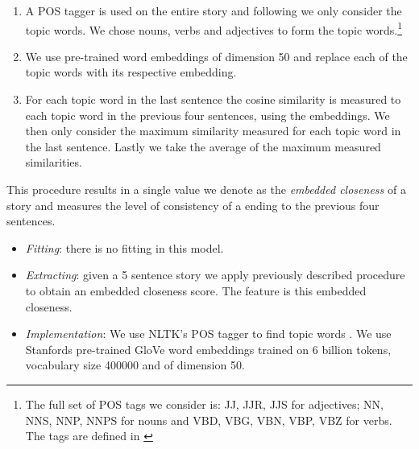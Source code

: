 \documentclass{article}
\begin{document}
\begin{enumerate}
	\item A POS tagger is used on the entire story and following \cite{COGCOMP} we only consider the topic words. We chose nouns, verbs and adjectives to form the topic words.\footnote{The full set of POS tags we consider is: JJ, JJR, JJS for adjectives; NN, NNS, NNP, NNPS for  nouns and VBD, VBG, VBN, VBP, VBZ for verbs. The tags are defined in \cite{TREEBANK}}
	\item We use pre-trained word embeddings of dimension 50 and replace each of the topic words with its respective embedding.
	\item For each topic word in the last sentence the cosine similarity is measured to each topic word in the previous four sentences, using the embeddings. We then only consider the maximum similarity measured for each topic word in the last sentence. Lastly we take the average of the maximum measured similarities. 
\end{enumerate}
This procedure results in a single value we denote as the \textit{embedded closeness} of a story and measures the level of consistency of a ending to the previous four sentences.
\begin{itemize}
	\item \textit{Fitting}: there is no fitting in this model.
	\item \textit{Extracting}: given a 5 sentence story we apply previously described procedure to obtain an embedded closeness score. The feature is this embedded closeness.
	\item \textit{Implementation}: We use NLTK's POS tagger to find topic words \cite{NLTK_VADER}. We use Stanfords pre-trained GloVe word embeddings \cite{GLOVE} trained on 6 billion tokens, vocabulary size 400000  and of dimension 50.
\end{itemize}
\end{document}
